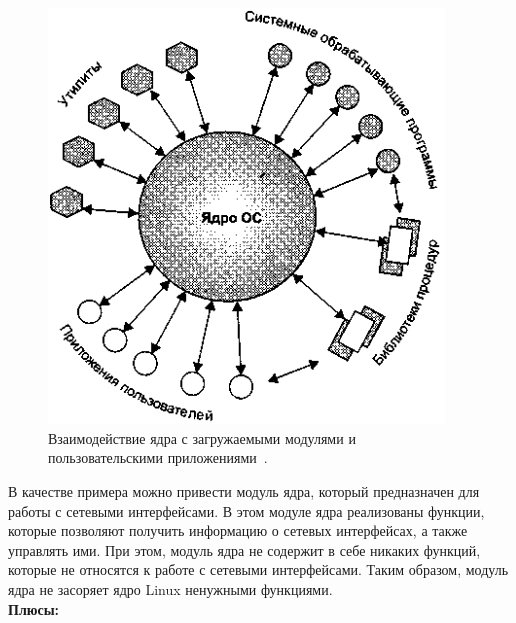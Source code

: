 \begin{figure}[H]
    \centering
    \includegraphics[width=105mm, scale=0.65]{inc/img/lkm}
    \captionsetup{justification=centering}
    \caption{Взаимодействие ядра с загружаемыми модулями и пользовательскими приложениями~\cite{lkm-pic}.}
    \label{fig:lkm}
\end{figure}

В качестве примера можно привести модуль ядра, который предназначен для работы с сетевыми интерфейсами.
В этом модуле ядра реализованы функции, которые позволяют получить информацию о сетевых интерфейсах, а также управлять ими.
При этом, модуль ядра не содержит в себе никаких функций, которые не относятся к работе с сетевыми интерфейсами.
Таким образом, модуль ядра не засоряет ядро Linux ненужными функциями.
\vspace{1mm}\\

\textbf{Плюсы:}

